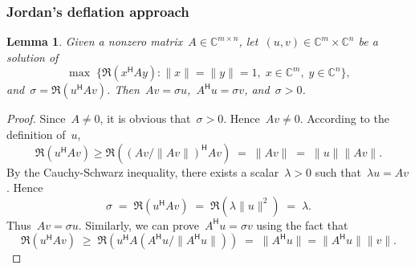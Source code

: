 \documentclass[11pt,a4paper]{article}  %
\numberwithin{equation}{section}
\newtheorem{lemma}{Lemma}%
\newtheorem{remark}{Remark}%
\theoremstyle{definition}
\def\CC{\mathbb{C}}
\newcommand{\hmt}{{\scriptscriptstyle{{\mathsf{H}}}}}
\begin{document}
\subsubsection{Jordan's deflation approach~\cite{Jordan_1874}}

\begin{lemma}
  \label{lem:jordan}
  Given a nonzero matrix~$A\in\CC^{m\times n}$, let~$(u,v)\in \CC^{m}\times \CC^{n}$ be a solution of
  \begin{equation}
    \nonumber
    \max\; \{\Re(x^\hmt A y) \mathrel{:} \|x\|=\|y\|=1, \; x \in \CC^{m}, \; y\in\CC^{n}\},
  \end{equation}
  and~${\sigma} = \Re(u^\hmt Av)$. Then~$Av = \sigma u$,~$A^\hmt u
  = \sigma v$, and~$\sigma>0$.
\end{lemma}

\begin{proof}
  Since~$A\neq 0$, it is obvious that~$\sigma >0$. Hence~$Av \neq 0$. According to the definition
  of~$u$,
  \begin{equation*}
    \Re(u^\hmt Av)\ge \Re(\left({Av}/{\|Av\|}\right)^\hmt Av) \;=\;
    \|Av\|\;=\;\|u\|\|Av\|.
  \end{equation*}
  By the Cauchy-Schwarz inequality, there exists a scalar~$\lambda>0$ such
  that~$\lambda u = Av$. Hence%
  \begin{equation*}
    \sigma \;=\; \Re(u^\hmt Av) \;=\; \Re(\lambda \|u\|^2) \;=\; \lambda.
  \end{equation*}
  Thus~$Av = \sigma u$. Similarly, we can prove~$A^\hmt u = \sigma v$ using the fact that
  \begin{equation*}
    \Re(u^\hmt A v)\;\ge\; \Re(u^\hmt A\left( A^\hmt u/\|A^\hmt
    u\|\right)) \;=\; \|A^\hmt u\| = \|A^\hmt u\|\|v\|.
  \end{equation*}
\end{proof}

\end{document}
